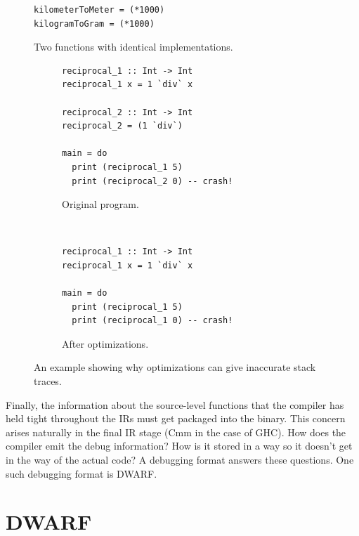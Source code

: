 \begin{figure}
\begin{mdframed}
  \begin{verbatim}
kilometerToMeter = (*1000)
kilogramToGram = (*1000)
  \end{verbatim}
  \caption{Two functions with identical implementations. }
  \label{fig:same_functions}
\end{mdframed}
\end{figure}

\begin{figure}
\begin{mdframed}
        \begin{subfigure}[t]{0.5\textwidth}
            \begin{verbatim}
reciprocal_1 :: Int -> Int
reciprocal_1 x = 1 `div` x

reciprocal_2 :: Int -> Int
reciprocal_2 = (1 `div`)

main = do
  print (reciprocal_1 5)
  print (reciprocal_2 0) -- crash!
            \end{verbatim}
            \caption{Original program.}
        \end{subfigure}
        ~ %
        \begin{subfigure}[t]{0.5\textwidth}
          \begin{verbatim}
reciprocal_1 :: Int -> Int
reciprocal_1 x = 1 `div` x

main = do
  print (reciprocal_1 5)
  print (reciprocal_1 0) -- crash!
          \end{verbatim}
          \caption{After optimizations.}
        \end{subfigure}
        \caption{An example showing why optimizations can give
        inaccurate stack traces.}\label{fig:optimization}
\end{mdframed}
\end{figure}

Finally, the information about the source-level functions that the compiler
has held tight throughout the IRs must get packaged into the binary. This
concern arises naturally in the final IR stage (Cmm in the case of GHC).  How does the compiler emit the
debug information? How is it stored in a way so it doesn't get in the way of the
actual code?  A debugging format answers these questions. One such debugging
format is DWARF.

\section{DWARF}

